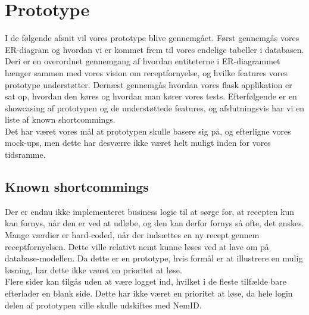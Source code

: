 \section{Prototype}
I de følgende afsnit vil vores prototype blive gennemgået. Først gennemgås vores ER-diagram og hvordan vi er kommet frem til vores endelige tabeller i databasen. Deri er en overordnet gennemgang af hvordan entiteterne i ER-diagrammet hænger sammen med vores vision om receptfornyelse, og hvilke features vores prototype understøtter. Dernæst gennemgås hvordan vores flask applikation er sat op, hvordan den køres og hvordan man kører vores tests. Efterfølgende er en showcasing af prototypen og de understøttede features, og afslutningsvis har vi en liste af known shortcommings.\\
Det har været vores mål at prototypen skulle basere sig på, og efterligne vores mock-ups, men dette har desværre ikke været helt muligt inden for vores tidsramme.






\newpage

\subsection{Known shortcommings}
Der er endnu ikke implementeret business logic til at sørge for, at recepten kun kan fornys, når den er ved at udløbe, og den kan derfor fornys så ofte, det ønskes.\\
Mange værdier er hard-coded, når der indsættes en ny recept gennem receptfornyelsen. Dette ville relativt nemt kunne løses ved at lave om på database-modellen. Da dette er en prototype, hvis formål er at illustrere en mulig løsning, har dette ikke været en prioritet at løse.\\
Flere sider kan tilgås uden at være logget ind, hvilket i de fleste tilfælde bare efterlader en blank side. Dette har ikke været en prioritet at løse, da hele login delen af prototypen ville skulle udskiftes med NemID.

